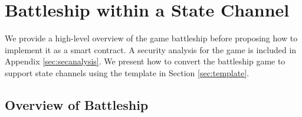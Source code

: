 \documentclass{llncs}
\newcommand{\hcell}{\mathsf{hcell}}
\newcommand{\hship}{\mathsf{hship}}
\begin{document}
	\section{Battleship within a State Channel} 
	
	We provide a high-level overview of the game battleship before proposing how to implement it as a smart contract.  
	A security analysis for the game is included in Appendix \ref{sec:secanalysis}.
	We present how to convert the battleship game to support state channels using the template in Section \ref{sec:template}. 
	
	\subsection{Overview of Battleship}
	
\end{document}
